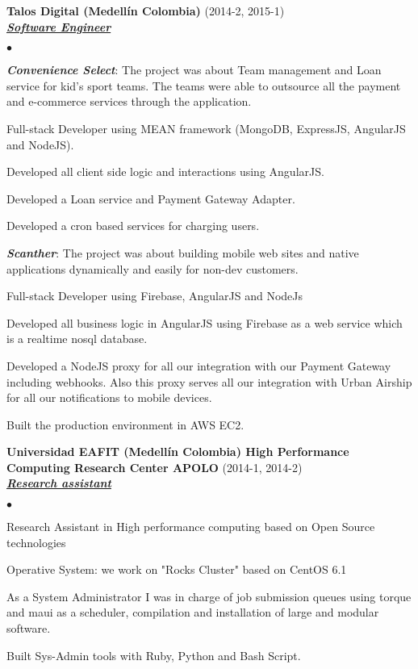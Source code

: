 \documentclass[a4paper]{article}
\newcommand{\employer}[3]{{
  \textbf{#1} (#2)\\ \underline{\textbf{\emph{#3}}}\\ }}
\newenvironment{achievements}{\begin{list}{$\bullet$}{\topsep 0pt \itemsep
  -2pt}}{\vspace*{4pt}\end{list}}
\newcommand{\emphasys}[1]{\textbf{\emph{#1}}}
\begin{document}
  \employer{ Talos Digital (Medell\'in Colombia)}{2014-2, 2015-1}{Software Engineer}
  \begin{achievements}
  \item \emphasys{Convenience Select}: The project was about Team management and Loan service for kid's sport teams. The teams were able to outsource all the payment and e-commerce services through the application.
  \item Full-stack Developer using MEAN framework  (MongoDB, ExpressJS, AngularJS and NodeJS).
  \item Developed all client side logic and interactions using AngularJS.
  \item Developed a Loan service and Payment Gateway Adapter.
  \item Developed a cron based services for charging users.
  \item \emphasys{Scanther}: The project was about building mobile web sites and native applications dynamically and easily for non-dev customers.
  \item Full-stack Developer using Firebase, AngularJS and NodeJs
  \item Developed all business logic in AngularJS using Firebase as a web service which is a realtime nosql database.
  \item Developed a NodeJS proxy for all our integration with our Payment Gateway including webhooks. Also this proxy serves all our integration with Urban Airship for all our notifications to mobile devices.
  \item Built the production environment in AWS EC2.
  \end{achievements}

  \employer{ Universidad EAFIT (Medell\'in Colombia) High Performance Computing Research Center APOLO}{2014-1, 2014-2}{Research assistant}
  \begin{achievements}
  \item Research Assistant in High performance computing based on Open Source technologies
  \item Operative System: we work on "Rocks Cluster" based on CentOS 6.1
  \item As a System Administrator I was in charge of job submission queues using torque and maui as a scheduler, compilation and installation of large and modular software.
  \item Built Sys-Admin tools with Ruby, Python and Bash Script.
  \end{achievements}
\end{document}
